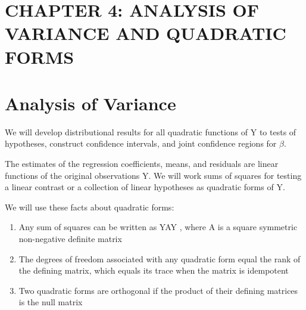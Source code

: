 \documentclass[letterpaper,11pt]{article}
\begin{document}





\section*{CHAPTER 4: ANALYSIS OF VARIANCE AND QUADRATIC FORMS}

\section{Analysis of Variance}

We will develop distributional results for all quadratic functions of Y to tests of hypotheses, construct confidence intervals, and joint 
confidence regions for $\beta$.

The estimates of the regression coefficients, means, and residuals are linear functions of the original observations Y.
We will work sums of squares for testing a linear contrast or a collection of linear hypotheses as quadratic forms of Y. 

We will use these facts about quadratic forms:

\begin{enumerate}
	\item Any sum of squares can be written as YAY , where A is a square symmetric non-negative definite matrix
	\item The degrees of freedom associated with any quadratic form equal the rank of the defining matrix, which equals its trace
         when the matrix is idempotent
	\item Two quadratic forms are orthogonal if the product of their defining matrices is the null matrix
\end{enumerate}
\end{document}
